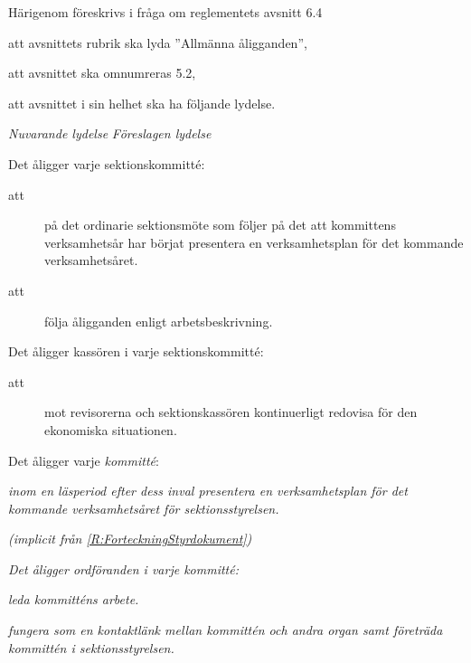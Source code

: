 \documentclass{article}
\newenvironment{lydelse}
    {\begin{paracol}{2}%
        \emph{Nuvarande lydelse}%
        \switchcolumn%
        \emph{Föreslagen lydelse}%
    \end{paracol}%
    \begin{enumerate}[label=\thesubsection.\arabic*]%
    \begin{paracol}{2}%
    }{\end{paracol}\end{enumerate}}
\begin{document}
Härigenom föreskrivs i fråga om reglementets avsnitt 6.4

\begin{dels}
    \item att avsnittets rubrik ska lyda ''Allmänna åligganden'',
    \item att avsnittet ska omnumreras 5.2,
    \item att avsnittet i sin helhet ska ha följande lydelse.
\end{dels}

\begin{lydelse}
    \setcounter{section}{6}
    \setcounter{subsection}{3}
    
    \item Det åligger varje sektionskommitté:
	\begin{description}
		\item[att] på det ordinarie sektionsmöte som följer på det att kommittens verksamhetsår har börjat presentera en verksamhetsplan för det kommande verksamhetsåret.     
		\item[att] följa åligganden enligt arbetsbeskrivning. 
	\end{description}
    
    \vspace{8em}
    \item Det åligger kassören i varje sektionskommitté:
	\begin{description}
		\item[att]  mot revisorerna och sektionskassören kontinuerligt redovisa för den ekonomiska situationen.
	\end{description}
	
    \setcounter{section}{5}
    \setcounter{subsection}{2}
    \switchcolumn
    
    \item Det åligger varje \emph{kommitté}:
    \begin{aligganden}
        \vspace{-0.4em}
        \item \emph{inom en läsperiod efter dess inval presentera en verksamhetsplan för det kommande verksamhetsåret för sektionsstyrelsen.}
        \item[] \item[] \emph{(implicit från \ref{R:ForteckningStyrdokument})}
    \end{aligganden}
    
    \vspace{-0.3em}
    \item \emph{Det åligger ordföranden i varje kommitté:}
    \begin{aligganden}
        \item \emph{leda kommitténs arbete.}
        \label{R:KommitteOrdfLeda}
        \item \emph{fungera som en kontaktlänk mellan kommittén och andra organ samt företräda kommittén i sektionsstyrelsen.}
        \label{R:KommitteOrdfRepr}
    \end{aligganden}
    

\end{lydelse}
\end{document}
